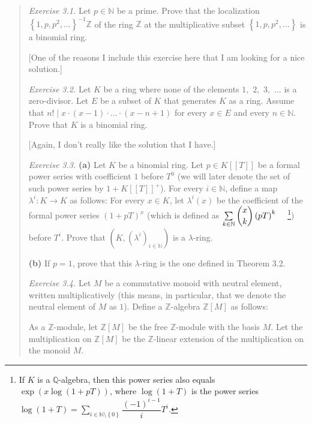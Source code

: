 \documentclass[numbers=enddot,12pt,final,onecolumn,notitlepage]{scrartcl}%
\begin{document}
\begin{quotation}
\textit{Exercise 3.1.} Let $p\in\mathbb{N}$ be a prime. Prove that the
localization $\left\{  1,p,p^{2},...\right\}  ^{-1}\mathbb{Z}$ of the ring
$\mathbb{Z}$ at the multiplicative subset $\left\{  1,p,p^{2},...\right\}  $
is a binomial ring.

{\small [One of the reasons I include this exercise here that I am looking for
a nice solution.]}

\textit{Exercise 3.2.} Let $K$ be a ring where none of the elements $1,$ $2,$
$3,$ $...$ is a zero-divisor. Let $E$ be a subset of $K$ that generates $K$ as
a ring. Assume that $n!\mid x\cdot\left(  x-1\right)  \cdot...\cdot\left(
x-n+1\right)  $ for every $x\in E$ and every $n\in\mathbb{N}$. Prove that $K$
is a binomial ring.

{\small [Again, I don't really like the solution that I have.]}

\textit{Exercise 3.3.} \textbf{(a)} Let $K$ be a binomial ring. Let $p\in
K\left[  \left[  T\right]  \right]  $ be a formal power series with
coefficient $1$ before $T^{0}$ (we will later denote the set of such power
series by $1+K\left[  \left[  T\right]  \right]  ^{+}$). For every
$i\in\mathbb{N}$, define a map $\lambda^{i}:K\rightarrow K$ as follows: For
every $x\in K$, let $\lambda^{i}\left(  x\right)  $ be the coefficient of the
formal power series $\left(  1+pT\right)  ^{x}$ (which is defined as
$\sum\limits_{k\in\mathbb{N}}\dbinom{x}{k}\left(  pT\right)  ^{k}%
\ \ \ \ $\footnote{If $K$ is a $\mathbb{Q}$-algebra, then this power series
also equals $\exp\left(  x\log\left(  1+pT\right)  \right)  $, where
$\log\left(  1+T\right)  $ is the power series $\log\left(  1+T\right)
=\sum\limits_{i\in\mathbb{N}\setminus\left\{  0\right\}  }\dfrac{\left(
-1\right)  ^{i-1}}{i}T^{i}$.}) before $T^{i}$. Prove that $\left(  K,\left(
\lambda^{i}\right)  _{i\in\mathbb{N}}\right)  $ is a $\lambda$-ring.

\textbf{(b)} If $p=1$, prove that this $\lambda$-ring is the one defined in
Theorem 3.2.

\textit{Exercise 3.4.} Let $M$ be a commutative monoid with neutral element,
written multiplicatively (this means, in particular, that we denote the
neutral element of $M$ as $1$). Define a $\mathbb{Z}$-algebra $\mathbb{Z}%
\left[  M\right]  $ as follows:

As a $\mathbb{Z}$-module, let $\mathbb{Z}\left[  M\right]  $ be the free
$\mathbb{Z}$-module with the basis $M$. Let the multiplication on
$\mathbb{Z}\left[  M\right]  $ be the $\mathbb{Z}$-linear extension of the
multiplication on the monoid $M$.


\end{quotation}
\end{document}
